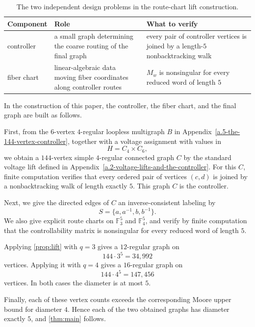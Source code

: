 \documentclass[11pt]{article}
\theoremstyle{definition}
\theoremstyle{remark}
\renewcommand{\_}{\textunderscore\allowbreak}
\begin{document}
\begin{table}[ht]
\centering
\caption{The two independent design problems in the route-chart lift construction.}
\label{tab:construction}
\begin{tabular}{>{\raggedright\arraybackslash}p{}>{\raggedright\arraybackslash}p{}>{\raggedright\arraybackslash}p{}}
\toprule
Component & Role & What to verify \\
\midrule
controller & a small graph determining the coarse routing of the final graph & every pair of controller vertices is joined by a length-\(5\) nonbacktracking walk \\
\midrule
fiber chart & linear-algebraic data moving fiber coordinates along controller routes & \(M_w\) is nonsingular for every reduced word of length \(5\) \\
\bottomrule
\end{tabular}
\end{table}

In the construction of this paper, the controller, the fiber chart, and
the final graph are built as follows.

First, from the \(6\)-vertex \(4\)-regular loopless multigraph \(B\) in
Appendix~\ref{a.5-the-144-vertex-controller}, together with a voltage assignment with values in \[
  H=C_4\times C_6,
\] we obtain a \(144\)-vertex simple \(4\)-regular connected graph \(C\)
by the standard voltage lift defined in Appendix~\ref{a.2-voltage-lifts-and-the-controller}. For this \(C\),
finite computation verifies that every ordered pair of vertices
\((c,d)\) is joined by a nonbacktracking walk of length exactly \(5\).
This graph \(C\) is the controller.

Next, we give the directed edges of \(C\) an inverse-consistent labeling
by \[
  S=\{a,a^{-1},b,b^{-1}\} .
\] We also give explicit route charts on \(\mathbb F_3^5\) and
\(\mathbb F_4^5\), and verify by finite computation that the
controllability matrix is nonsingular for every reduced word of length
\(5\).

Applying \cref{prop:lift} with \(q=3\) gives a \(12\)-regular graph on \[
  144\cdot3^5=34{,}992
\] vertices. Applying it with \(q=4\) gives a \(16\)-regular graph on \[
  144\cdot4^5=147{,}456
\] vertices. In both cases the diameter is at most \(5\).

Finally, each of these vertex counts exceeds the corresponding Moore
upper bound for diameter \(4\). Hence each of the two obtained graphs
has diameter exactly \(5\), and \cref{thm:main} follows.
\end{document}

